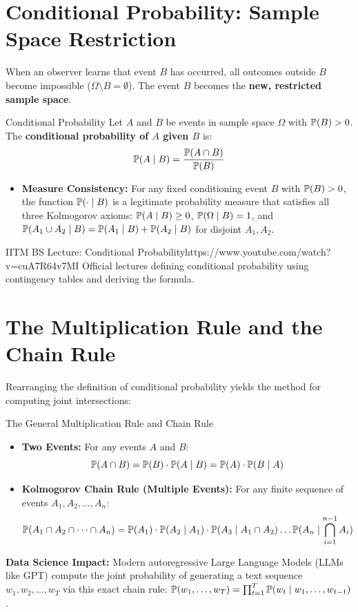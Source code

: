 \section{Conditional Probability: Sample Space Restriction}

When an observer learns that event $B$ has occurred, all outcomes outside $B$ become impossible ($\Omega \setminus B = \emptyset$). The event $B$ becomes the \textbf{new, restricted sample space}.

\begin{definitionbox}{Conditional Probability}
Let $A$ and $B$ be events in sample space $\Omega$ with $\P(B) > 0$. The \textbf{conditional probability of $A$ given $B$} is:
$$\P(A \mid B) = \frac{\P(A \cap B)}{\P(B)}$$
\begin{itemize}
    \item \textbf{Measure Consistency:} For any fixed conditioning event $B$ with $\P(B) > 0$, the function $\P(\cdot \mid B)$ is a legitimate probability measure that satisfies all three Kolmogorov axioms: $\P(A \mid B) \ge 0$, $\P(\Omega \mid B) = 1$, and $\P(A_1 \cup A_2 \mid B) = \P(A_1 \mid B) + \P(A_2 \mid B)$ for disjoint $A_1, A_2$.
\end{itemize}
\end{definitionbox}

\begin{videocard}{IITM BS Lecture: Conditional Probability}{https://www.youtube.com/watch?v=cuA7R64v7MI}
Official lectures defining conditional probability using contingency tables and deriving the formula.
\end{videocard}

\section{The Multiplication Rule and the Chain Rule}

Rearranging the definition of conditional probability yields the method for computing joint intersections:

\begin{theorembox}{The General Multiplication Rule and Chain Rule}
\begin{itemize}
    \item \textbf{Two Events:} For any events $A$ and $B$:
    $$\P(A \cap B) = \P(B) \cdot \P(A \mid B) = \P(A) \cdot \P(B \mid A)$$
    \item \textbf{Kolmogorov Chain Rule (Multiple Events):} For any finite sequence of events $A_1, A_2, \dots, A_n$:
    $$\P(A_1 \cap A_2 \cap \dots \cap A_n) = \P(A_1) \cdot \P(A_2 \mid A_1) \cdot \P(A_3 \mid A_1 \cap A_2) \dots \P(A_n \mid \bigcap_{i=1}^{n-1} A_i)$$
\end{itemize}
\textbf{Data Science Impact:} Modern autoregressive Large Language Models (LLMs like GPT) compute the joint probability of generating a text sequence $w_1, w_2, \dots, w_T$ via this exact chain rule: $\P(w_1, \dots, w_T) = \prod_{t=1}^T \P(w_t \mid w_1, \dots, w_{t-1})$.
\end{theorembox}

